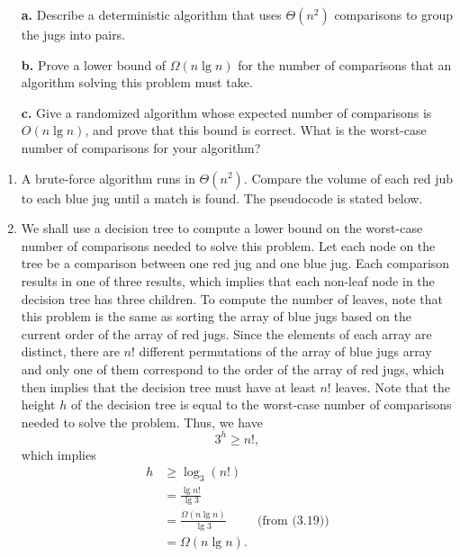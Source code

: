 \documentclass{report}
\makeatletter
\renewenvironment{framed}{%
 \def\FrameCommand##1{\hskip\@totalleftmargin
 \fboxsep=\FrameSep\fbox{##1}}%
 \MakeFramed {\advance\hsize-\width
   \@totalleftmargin\z@ \linewidth\hsize
   \@setminipage}}%
 {\par\unskip\endMakeFramed}
\let\oldnl\nl%
\newcommand{\nonl}{\renewcommand{\nl}{\let\nl\oldnl}}%
\makeatother
\begin{document}
\begin{enumerate}
{\begin{itemize}
\item[\textbf{a.}]{Describe a deterministic algorithm that uses $\Theta(n^2)$
comparisons to group the jugs into pairs.}
\item[\textbf{b.}]{Prove a lower bound of $\Omega(n \lg n)$ for the number of
comparisons that an algorithm solving this problem must take.}
\item[\textbf{c.}]{Give a randomized algorithm whose expected number of
comparisons is $O(n \lg n)$, and prove that this bound is correct. What is the
worst-case number of comparisons for your algorithm?}
\end{itemize}
}

\begin{framed}
\begin{enumerate}
\item A brute-force algorithm runs in $\Theta(n^2)$. Compare the volume of each
red jub to each blue jug until a match is found. The pseudocode is stated below.

\begin{algorithm}[H]
\SetAlgoNoEnd\DontPrintSemicolon
\BlankLine
{}
\nonl{}
\end{algorithm}

\item We shall use a decision tree to compute a lower bound on the worst-case
number of comparisons needed to solve this problem. Let each node on the tree be
a comparison between one red jug and one blue jug. Each comparison results in
one of three results, which implies that each non-leaf node in the decision tree
has three children. To compute the number of leaves, note that this problem is
the same as sorting the array of blue jugs based on the current order of the
array of red jugs. Since the elements of each array are distinct, there are $n!$
different permutations of the array of blue jugs array and only one of them
correspond to the order of the array of red jugs, which then implies that the
decision tree must have at least $n!$ leaves. Note that the height $h$ of the
decision tree is equal to the worst-case number of comparisons needed to solve
the problem. Thus, we have
\[
  3^h \ge n!,
\]
which implies
\begin{equation*}
\begin{aligned}
  h &\ge \log_3 (n!)\\
    &=   \frac{\lg n!}{\lg 3}\\
    &=   \frac{\Omega(n \lg n)}{\lg 3} & \text{(from (3.19))}\\
    &=   \Omega(n \lg n).
\end{aligned}
\end{equation*}


\end{enumerate}
\end{framed}
\end{enumerate}
\end{document}
